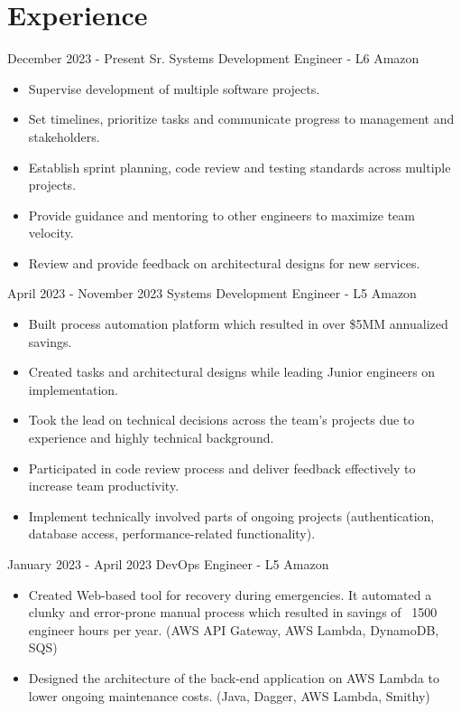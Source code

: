 \documentclass[]{friggeri-cv}
\begin{document}
\section{Experience}
\begin{entrylist}
  \entry
    {December 2023 - Present}
    {Sr. Systems Development Engineer - L6}
    {Amazon}
    {\begin{itemize}
        \item Supervise development of multiple software projects.
        \item Set timelines, prioritize tasks and communicate progress to management and stakeholders.
        \item Establish sprint planning, code review and testing standards across multiple projects.
        \item Provide guidance and mentoring to other engineers to maximize team velocity.
        \item Review and provide feedback on architectural designs for new services.
    \end{itemize}}
  \entry
    {April 2023 - November 2023}
    {Systems Development Engineer - L5}
    {Amazon}
    {\begin{itemize}
        \item Built process automation platform which resulted in over \$5MM annualized savings.
        \item Created tasks and architectural designs while leading Junior engineers on implementation.
        \item Took the lead on technical decisions across the team's projects due to experience and highly technical background.
        \item Participated in code review process and deliver feedback effectively to increase team productivity.
        \item Implement technically involved parts of ongoing projects (authentication, database access, performance-related functionality).
    \end{itemize}}
  \entry
    {January 2023 - April 2023}
    {DevOps Engineer - L5}
    {Amazon}
    {\begin{itemize}
        \item Created Web-based tool for recovery during emergencies. It automated a clunky and error-prone manual process which resulted in savings of ~1500 engineer hours per year. (AWS API Gateway, AWS Lambda, DynamoDB, SQS)
        \item Designed the architecture of the back-end application on AWS Lambda to lower ongoing maintenance costs. (Java, Dagger, AWS Lambda, Smithy)

\end{itemize}}
\end{entrylist}
\end{document}

